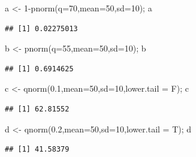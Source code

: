 \documentclass[
  11pt,
]{book}
\newenvironment{Shaded}{\begin{snugshade}}{\end{snugshade}}
\newcommand{\AttributeTok}[1]{\textcolor[rgb]{0.77,0.63,0.00}{#1}}
\newcommand{\DecValTok}[1]{\textcolor[rgb]{0.00,0.00,0.81}{#1}}
\newcommand{\FloatTok}[1]{\textcolor[rgb]{0.00,0.00,0.81}{#1}}
\newcommand{\FunctionTok}[1]{\textcolor[rgb]{0.00,0.00,0.00}{#1}}
\newcommand{\NormalTok}[1]{#1}
\newcommand{\OtherTok}[1]{\textcolor[rgb]{0.56,0.35,0.01}{#1}}
\newcommand{\SpecialCharTok}[1]{\textcolor[rgb]{0.00,0.00,0.00}{#1}}
\theoremstyle{definition}
\theoremstyle{definition}
\theoremstyle{definition}
\theoremstyle{definition}
\theoremstyle{remark}
\begin{document}
\begin{Shaded}
\begin{Highlighting}[]
\NormalTok{a }\OtherTok{\textless{}{-}} \DecValTok{1}\SpecialCharTok{{-}}\FunctionTok{pnorm}\NormalTok{(}\AttributeTok{q=}\DecValTok{70}\NormalTok{,}\AttributeTok{mean=}\DecValTok{50}\NormalTok{,}\AttributeTok{sd=}\DecValTok{10}\NormalTok{); a}
\end{Highlighting}
\end{Shaded}

\begin{verbatim}
## [1] 0.02275013
\end{verbatim}

\begin{Shaded}
\begin{Highlighting}[]
\NormalTok{b }\OtherTok{\textless{}{-}} \FunctionTok{pnorm}\NormalTok{(}\AttributeTok{q=}\DecValTok{55}\NormalTok{,}\AttributeTok{mean=}\DecValTok{50}\NormalTok{,}\AttributeTok{sd=}\DecValTok{10}\NormalTok{); b}
\end{Highlighting}
\end{Shaded}

\begin{verbatim}
## [1] 0.6914625
\end{verbatim}

\begin{Shaded}
\begin{Highlighting}[]
\NormalTok{c }\OtherTok{\textless{}{-}} \FunctionTok{qnorm}\NormalTok{(}\FloatTok{0.1}\NormalTok{,}\AttributeTok{mean=}\DecValTok{50}\NormalTok{,}\AttributeTok{sd=}\DecValTok{10}\NormalTok{,}\AttributeTok{lower.tail =}\NormalTok{ F); c}
\end{Highlighting}
\end{Shaded}

\begin{verbatim}
## [1] 62.81552
\end{verbatim}

\begin{Shaded}
\begin{Highlighting}[]
\NormalTok{d }\OtherTok{\textless{}{-}} \FunctionTok{qnorm}\NormalTok{(}\FloatTok{0.2}\NormalTok{,}\AttributeTok{mean=}\DecValTok{50}\NormalTok{,}\AttributeTok{sd=}\DecValTok{10}\NormalTok{,}\AttributeTok{lower.tail =}\NormalTok{ T); d}
\end{Highlighting}
\end{Shaded}

\begin{verbatim}
## [1] 41.58379
\end{verbatim}
\end{document}
